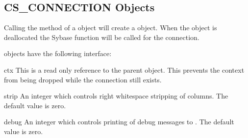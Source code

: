 \subsection{CS_CONNECTION Objects}

Calling the  method of a 
object will create a  object.  When the
 object is deallocated the Sybase
 function will be called for the connection.

 objects have the following interface:

\begin{memberdesc}[CS_CONNECTION]{ctx}
This is a read only reference to the parent  object.
This prevents the context from being dropped while the connection
still exists.
\end{memberdesc}

\begin{memberdesc}[CS_CONNECTION]{strip}
An integer which controls right whitespace stripping of 
columns.  The default value is zero.
\end{memberdesc}

\begin{memberdesc}[CS_CONNECTION]{debug}
An integer which controls printing of debug messages to .
The default value is zero.
\end{memberdesc}

